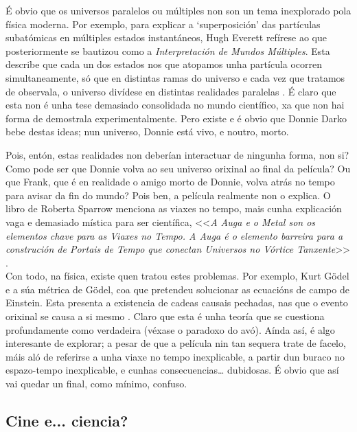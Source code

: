 \begin{refsection}
\begin{multicols}{2}
É obvio que os universos paralelos ou múltiples non son un tema inexplorado
pola física moderna. Por exemplo, para explicar a `superposición’ das
partículas subatómicas en múltiples estados instantáneos, Hugh Everett refírese
ao que posteriormente se bautizou como a \textit{Interpretación de Mundos
Múltiples}. Esta describe que cada un dos estados nos que atopamos unha
partícula ocorren simultaneamente, só que en distintas ramas do universo e cada
vez que tratamos de observala, o universo divídese en distintas realidades
paralelas \cite{gribbin2004historia}. É claro que esta non é unha tese demasiado
consolidada no mundo científico, xa que non hai forma de demostrala
experimentalmente. Pero existe e é obvio que Donnie Darko bebe destas ideas;
nun universo, Donnie está vivo, e noutro, morto.

Pois, entón, estas realidades non deberían interactuar de ningunha forma, non
si? Como pode ser que Donnie volva ao seu universo orixinal ao final da
película? Ou que Frank, que é en realidade o amigo morto de Donnie, volva atrás
no tempo para avisar da fin do mundo? Pois ben, a película realmente non o
explica. O libro de Roberta Sparrow menciona as viaxes no tempo, mais cunha
explicación vaga e demasiado mística para ser científica, <<\textit{A Auga e o
Metal son os elementos chave para as Viaxes no Tempo. A Auga é o elemento
barreira para a construción de Portais de Tempo que conectan Universos no
Vórtice Tanxente}>> \cite{donnie_darko}.\\

Con todo, na física, existe quen tratou estes problemas. Por exemplo, Kurt
Gödel e a súa métrica de Gödel, coa que pretendeu solucionar as ecuacións de
campo de Einstein. Esta presenta a existencia de cadeas causais pechadas, nas
que o evento orixinal se causa a si mesmo \cite{nunez.r_2021}. Claro que esta é unha
teoría que se cuestiona profundamente como verdadeira (véxase o paradoxo do
avó). Aínda así, é algo interesante de explorar; a pesar de que a película nin
tan sequera trate de facelo, máis aló de referirse a unha viaxe no tempo
inexplicable, a partir dun buraco no espazo-tempo inexplicable, e cunhas
consecuencias… dubidosas. É obvio que así vai quedar un final, como mínimo,
confuso.

\subsection*{Cine e... ciencia?}


\end{multicols}
\end{refsection}

